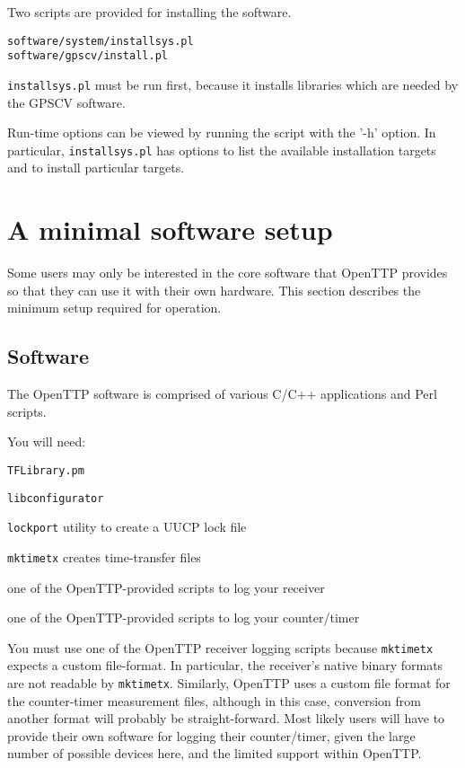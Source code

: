 \documentclass[11pt,a4paper,openany,oneside]{book}
\newcommand{\cc}[1]{{\small\texttt{#1}}}
\newenvironment{description*}%
  {\setlength{\parskip}{0pt}%
	 \begin{description}%
		\setlength{\topsep}{-12pt}%
		\setlength{\itemindent}{-12pt}%
    \setlength{\itemsep}{0pt}%
		\setlength{\itemsep}{0pt}}%
  {\end{description}}
\begin{document}
Two scripts are provided for installing the software.
\begin{lstlisting}
software/system/installsys.pl
software/gpscv/install.pl
\end{lstlisting}

\cc{installsys.pl} must be run first, because it installs libraries which are needed by the GPSCV software.

Run-time options can be viewed by running the script with the '-h' option. In particular, \cc{installsys.pl}
has options to list the available installation targets and to install particular targets.

\section{A minimal software setup}

Some users may only be interested in the core software that OpenTTP provides so that they can use
it with their own hardware. This section describes the minimum setup required for operation.

\subsection{Software}

The OpenTTP software is comprised of various C/C++ applications and Perl scripts.

You will need:
\begin{description*}
	\item \cc{TFLibrary.pm}
	\item \cc{libconfigurator}
	\item \cc{lockport} utility to create a UUCP lock file
	\item \cc{mktimetx} creates time-transfer files
	\item one of the OpenTTP-provided scripts to log your receiver
	\item one of the OpenTTP-provided scripts to log your counter/timer
\end{description*}

You must use one of the OpenTTP receiver logging scripts because \cc{mktimetx} expects a custom file-format. In particular, the
receiver's native binary formats are not readable by \cc{mktimetx}. Similarly, OpenTTP uses a custom file
format for the counter-timer measurement files, although in this case, conversion from another format
will probably be straight-forward. Most likely users will have to provide their own software for
logging their counter/timer, given the large number of possible devices here, and the limited
support within OpenTTP.
\end{document}
